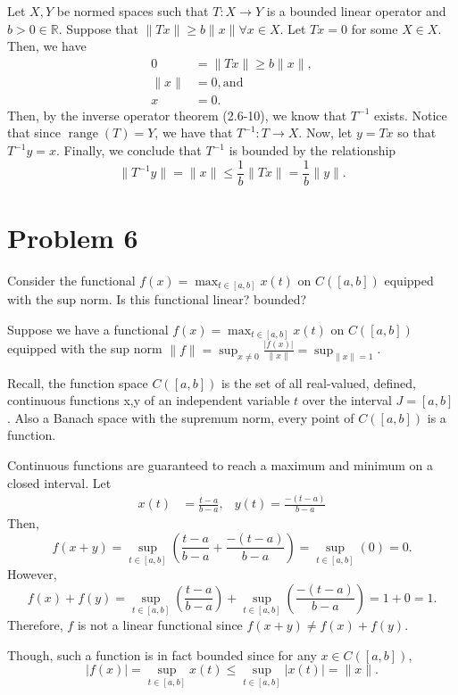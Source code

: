 \documentclass[12pt]{article}
\DeclareMathOperator{\range}{range}
\begin{document}
Let $X,Y$ be normed spaces such that $T: X \to Y$ is a bounded linear operator and $b>0 \in \mathbb{R}$.
Suppose that  $\|Tx\| \geq b\|x\| \forall x \in X$. Let $Tx=0$ for some $X \in X$. Then, we have
\begin{align}
    0 &= \|Tx\| \geq b\|x\|, \\
    \|x\| &= 0, \text{and} \\
    x &= 0.
\end{align}
Then, by the inverse operator theorem (2.6-10), we know that $T^{-1}$ exists. Notice that since 
$\range{(T)}=Y$, we have that $T^{-1}: T \to X$. Now, let $y=Tx$ so that $T^{-1}y=x$. Finally, we
conclude that $T^{-1}$ is bounded by the relationship
\[
    \|T^{-1}y\| = \|x\| \leq \frac{1}{b}\|Tx\| = \frac{1}{b}\|y\|.
\]



\newpage
\section{Problem 6}
\begin{mdframed}
    Consider the functional $f(x) = \max_{t\in[a,b]} x(t)$ on $C([a,b])$ equipped with the sup norm. 
    Is this functional linear? bounded?
\end{mdframed}

Suppose we have a functional $f(x) = \max_{t\in[a,b]} x(t)$ on $C([a,b])$ equipped with the sup norm
$\|f\| = \sup_{x\neq 0} \frac{|f(x)|}{\|x\|} = \sup_{\|x\|=1}$.

Recall, the function space $C([a,b])$ is the set of all real-valued, defined, continuous functions x,y 
of an independent variable $t$ over the interval $J=[a,b]$. Also a Banach space with the supremum norm, 
every point of $C([a,b])$ is a function.

Continuous functions are guaranteed to reach a maximum and minimum on a closed interval. Let
\begin{align*}
    x(t) &= \frac{t-a}{b-a}, &y(t)= \frac{-(t-a)}{b-a} 
\end{align*}
Then,
\[
    f(x + y) = \sup_{t \in [a,b]}(\frac{t-a}{b-a} + \frac{-(t-a)}{b-a}) = \sup_{t \in [a,b]}(0) = 0.
\]
However, 
\[
    f(x) + f(y) = \sup_{t \in [a,b]}(\frac{t-a}{b-a}) + \sup_{t \in [a,b]}(\frac{-(t-a)}{b-a}) = 1 + 0 = 1.
\]
Therefore, $f$ is not a linear functional since $f(x+y) \neq f(x) + f(y)$.

Though, such a function is in fact bounded since for any $x \in C([a,b])$,
\[
    |f(x)| = \sup_{t\in [a,b]} x(t) \leq \sup_{t\in [a,b]} |x(t)| = \|x\|.
\]
\end{document}
